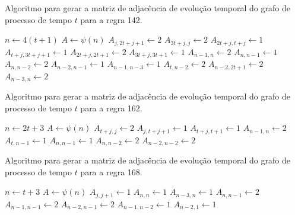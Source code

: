 \documentclass[12pt,a4paper]{article}
\begin{document}
\begin{algorithm}[H]
\caption{Algoritmo para gerar a matriz de adjacência de evolução temporal do
grafo de processo de tempo $t$ para a regra 142.}
\label{alg:r142}
\begin{algorithmic}
\STATE $n \leftarrow 4(t+1)$
\STATE $A \leftarrow \psi(n)$
        \STATE $A_{j,2t+j+1} \leftarrow 2$
    \ENDFOR
\ENDIF
{}
    \STATE $A_{3t+j,j} \leftarrow 2$
    \STATE $A_{2t+j,t+j} \leftarrow 1$
    \STATE $A_{t+j,3t+j+1} \leftarrow 1$
    \STATE $A_{2t+j,2t+1} \leftarrow 2$
\ENDFOR
{}
    \STATE $A_{3t+j,3t+1} \leftarrow 1$
\ENDFOR
\STATE $A_{n-1,n} \leftarrow 2$
\STATE $A_{n,n-1} \leftarrow 1$
\STATE $A_{n,n-2} \leftarrow 2$
\STATE $A_{n-2,n-1} \leftarrow 1$
\STATE $A_{n-1,n-3} \leftarrow 1$
\STATE $A_{t,n-2} \leftarrow 2$
\STATE $A_{n-2,2t+1} \leftarrow 2$
\STATE $A_{n-3,n} \leftarrow 2$
\end{algorithmic}
\end{algorithm}

\begin{algorithm}[H]
\caption{Algoritmo para gerar a matriz de adjacência de evolução temporal do
grafo de processo de tempo $t$ para a regra 162.}
\label{alg:r162}
\begin{algorithmic}
\STATE $n \leftarrow 2t+3$
\STATE $A \leftarrow \psi(n)$
    \STATE $A_{t+j,j} \leftarrow 2$
\ENDFOR
{}
        \STATE $A_{j,t+j+1} \leftarrow 1$
    \ENDFOR
\ENDIF
{}
    \STATE $A_{t+j,t+1} \leftarrow 1$
\ENDFOR
\STATE $A_{n-1,n} \leftarrow 2$
\STATE $A_{t,n-1} \leftarrow 1$
\STATE $A_{n,n-1} \leftarrow 1$
\STATE $A_{n,n-2} \leftarrow 2$
\STATE $A_{n-2,n-2} \leftarrow 2$
\end{algorithmic}
\end{algorithm}

\begin{algorithm}[H]
\caption{Algoritmo para gerar a matriz de adjacência de evolução temporal do
grafo de processo de tempo $t$ para a regra 168.}
\label{alg:r168}
\begin{algorithmic}
\STATE $n \leftarrow t+3$
\STATE $A \leftarrow \psi(n)$
        \STATE $A_{j,j+1} \leftarrow 1$
    \ENDFOR
\ENDIF
\STATE $A_{n,n} \leftarrow 1$
\STATE $A_{n-3,n} \leftarrow 1$
\STATE $A_{n,n-1} \leftarrow 2$
\STATE $A_{n-1,n-1} \leftarrow 2$
\STATE $A_{n-2,n-1} \leftarrow 2$
\STATE $A_{n-1,n-2} \leftarrow 1$
\STATE $A_{n-2,1} \leftarrow 1$
\end{algorithmic}
\end{algorithm}
\end{document}
